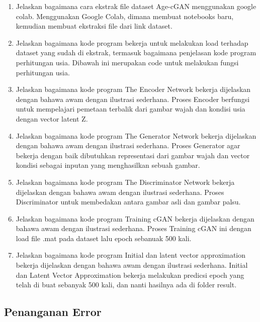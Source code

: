     \begin{enumerate}
	\item Jelaskan bagaimana cara ekstrak ﬁle dataset Age-cGAN menggunakan google colab.
    Menggunakan Google Colab, dimana membuat notebooks baru, kemudian membuat ekstraksi file dari link dataset.
	

	\item Jelaskan bagaimana kode program bekerja untuk melakukan load terhadap dataset yang sudah di ekstrak, termasuk bagaimana penjelasan kode program perhitungan usia.
    Dibawah ini merupakan code untuk melakukan fungsi perhitungan usia.
	

	\item Jelaskan bagaimana kode program The Encoder Network bekerja dijelaskan dengan bahawa awam dengan ilustrasi sederhana.
    Proses Encoder berfungsi untuk mempelajari pemetaan terbalik dari gambar wajah dan kondisi usia dengan vector latent Z.
	

	\item Jelaskan bagaimana kode program The Generator Network bekerja dijelaskan dengan bahawa awam dengan ilustrasi sederhana.
    Proses Generator agar bekerja dengan baik dibutuhkan representasi dari gambar wajah dan vector kondisi sebagai inputan yang menghasilkan sebuah gambar.
	

    \item Jelaskan bagaimana kode program The Discriminator Network bekerja dijelaskan dengan bahawa awam dengan ilustrasi sederhana.
    Proses Discriminator untuk membedakan antara gambar asli dan gambar palsu.
	

    \item Jelaskan bagaimana kode program Training cGAN bekerja dijelaskan dengan bahawa awam dengan ilustrasi sederhana.
    Proses Training cGAN ini dengan load file .mat pada dataset lalu epoch sebanuak 500 kali.

	

    \item Jelaskan bagaimana kode program Initial dan latent vector approximation bekerja dijelaskan dengan bahawa awam dengan ilustrasi sederhana.
    Initial dan Latent Vector Approximation bekerja melakukan predicsi epoch yang telah di buat sebanyak 500 kali, dan nanti hasilnya ada di folder result.

	

\end{enumerate}

\subsection{Penanganan Error}

